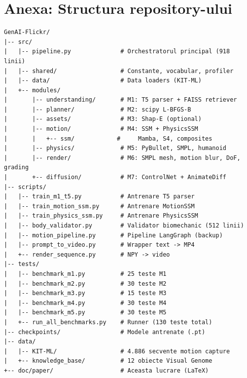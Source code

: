 ﻿\chapter{Anexa: Structura repository-ului}
\label{chap:anexa}

\begin{verbatim}
GenAI-Flickr/
|-- src/
|   |-- pipeline.py              # Orchestratorul principal (918 linii)
|   |-- shared/                  # Constante, vocabular, profiler
|   |-- data/                    # Data loaders (KIT-ML)
|   +-- modules/
|       |-- understanding/       # M1: T5 parser + FAISS retriever
|       |-- planner/             # M2: scipy L-BFGS-B
|       |-- assets/              # M3: Shap-E (optional)
|       |-- motion/              # M4: SSM + PhysicsSSM
|       |   +-- ssm/            #     Mamba, S4, composites
|       |-- physics/             # M5: PyBullet, SMPL, humanoid
|       |-- render/              # M6: SMPL mesh, motion blur, DoF, grading
|       +-- diffusion/           # M7: ControlNet + AnimateDiff
|-- scripts/
|   |-- train_m1_t5.py           # Antrenare T5 parser
|   |-- train_motion_ssm.py      # Antrenare MotionSSM
|   |-- train_physics_ssm.py     # Antrenare PhysicsSSM
|   |-- body_validator.py        # Validator biomechanic (512 linii)
|   |-- motion_pipeline.py       # Pipeline LangGraph (backup)
|   |-- prompt_to_video.py       # Wrapper text -> MP4
|   +-- render_sequence.py       # NPY -> video
|-- tests/
|   |-- benchmark_m1.py          # 25 teste M1
|   |-- benchmark_m2.py          # 30 teste M2
|   |-- benchmark_m3.py          # 15 teste M3
|   |-- benchmark_m4.py          # 30 teste M4
|   |-- benchmark_m5.py          # 30 teste M5
|   +-- run_all_benchmarks.py    # Runner (130 teste total)
|-- checkpoints/                 # Modele antrenate (.pt)
|-- data/
|   |-- KIT-ML/                  # 4.886 secvente motion capture
|   +-- knowledge_base/          # 12 obiecte Visual Genome
+-- doc/paper/                   # Aceasta lucrare (LaTeX)
\end{verbatim}
